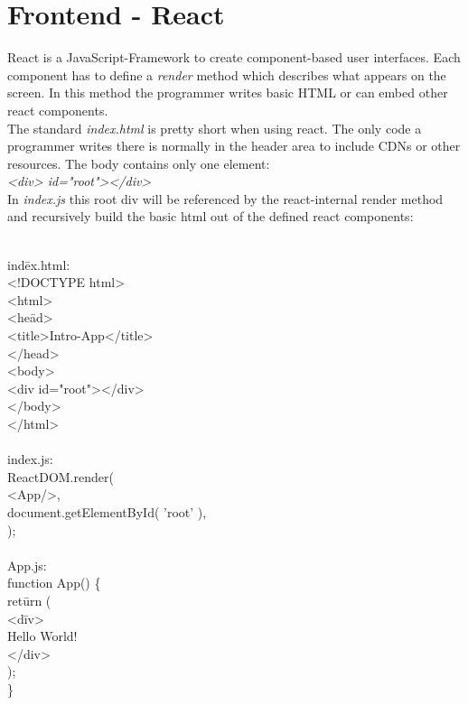 \section{Frontend - React}
React is a JavaScript-Framework to create component-based user interfaces. Each component has to define a \emph{render} method which describes what appears on the screen. In this method the programmer writes basic HTML or can embed other react components. \\
The standard \emph{index.html} is pretty short when using react. The only code a programmer writes there is normally in the header area to include CDNs or other resources. The body contains only one element: \\
\emph{<div> id="root"></div>} \\
In \emph{index.js} this root div will be referenced by the react-internal render method and recursively build the basic html out of the defined react components:
\begin{exmp}
\label{ex251}
\begin{tabbing}
\\
ind\=ex.html: \\
<!DOCTYPE html> \\
<html> \\
\>  <he\=ad> \\
\>\>    <title>Intro-App</title> \\
\>  </head> \\
\>  <body> \\
\>\>  <div id="root"></div> \\
\>  </body> \\
</html> \\
 \\
index.js: \\
ReactDOM.render( \\
\>	<App/>, \\
\>	document.getElementById( 'root' ), \\
); \\
\\
App.js: \\
function App() \{ \\
\>  ret\=urn ( \\
\>\>    <d\=iv> \\
\>\>\>     Hello World! \\
\>\>   </div> \\
\>  ); \\
\}
\end{tabbing}
\end{exmp}
